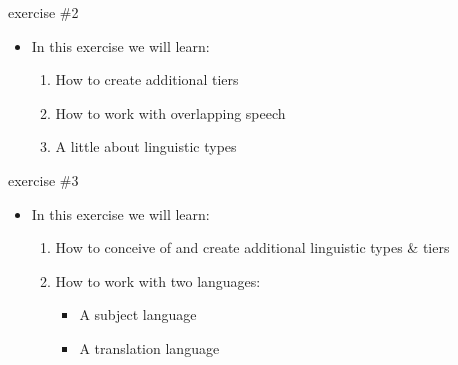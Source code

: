 \documentclass{beamer}
\begin{document}
   \begin{frame}{exercise \#2}
    \begin{itemize}
      \item<1-> In this exercise we will learn:
        \begin{enumerate}
          \item<2-> How to create additional tiers
          \item<3-> How to work with overlapping speech
          \item<4-> A little about linguistic types
        \end{enumerate}
    \end{itemize}
   \end{frame} 
   
   \begin{frame}{exercise \#3}
    \begin{itemize}
      \item<1-> In this exercise we will learn:
        \begin{enumerate}
          \item<2-> How to conceive of and create additional linguistic types \& tiers
          \item<3-> How to work with two languages:
            \begin{itemize}
              \item<4-> A subject language
              \item<4-> A translation language
            \end{itemize}
        \end{enumerate}
    \end{itemize}
   \end{frame} 
\end{document}
